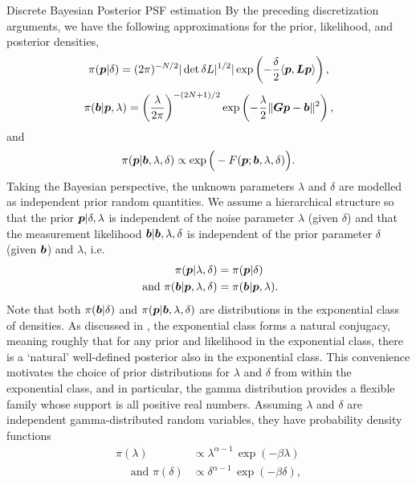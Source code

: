 \begin{chapter}{Discrete Bayesian Posterior PSF estimation}
By the preceding discretization arguments, we have the following approximations for the prior, likelihood, and posterior densities,
\begin{equation}\label{eq:discretePrior}
  \pi(\mbox{\boldmath$p$}| \delta) =(2\pi)^{-N/2} |\det \delta L|^{1/2}|\exp\left(-\frac \delta2 \langle \mbox{\boldmath$p$},\mbox{\boldmath$L$}\mbox{\boldmath$p$}\rangle\right),
\end{equation}
\begin{equation} \label{eq:discreteLiklihood}
  \pi(\mbox{\boldmath$b$} |\mbox{\boldmath$p$},\lambda) = \left(\frac{\lambda}{2\pi}  \right)^{-(2N+1)/2} \exp\left(-\frac \lambda2 \|\mbox{\boldmath$G$}\mbox{\boldmath$p$}-\mbox{\boldmath$b$}\|^2\right),
\end{equation}
and
\begin{equation}\label{eq:discretePosterior}
  \pi(\mbox{\boldmath$p$} | \mbox{\boldmath$b$},\lambda, \delta) \propto \exp\Big(-F(\mbox{\boldmath$p$};\mbox{\boldmath$b$},\lambda,\delta) \Big).
\end{equation}
Taking the Bayesian perspective, the unknown parameters $\lambda$ and $\delta$ are modelled as independent prior random quantities.
We assume a hierarchical structure so that the prior $\mbox{\boldmath$p$}|\delta,\lambda$ is independent of the noise parameter $\lambda$ (given $\delta$) and that the measurement likelihood $\mbox{\boldmath$b$}|\mbox{\boldmath$b$},\lambda,\delta$ is independent of the prior parameter $\delta$ (given $\mbox{\boldmath$b$}$) and $\lambda$, i.e.
\begin{align}
  \pi(\mbox{\boldmath$p$}|\lambda,\delta) &= \pi(\mbox{\boldmath$p$}|\delta) \\
\text{ and } \pi(\mbox{\boldmath$b$}|\mbox{\boldmath$p$},\lambda,\delta) &= \pi(\mbox{\boldmath$b$}|\mbox{\boldmath$p$},\lambda).
\end{align}
Note that both $\pi(\mbox{\boldmath$b$}|\delta)$ and $\pi(\mbox{\boldmath$p$}|\mbox{\boldmath$b$},\lambda,\delta)$ are distributions in the exponential class of densities.
As discussed in \citep{gelman2014bayesian}, the exponential class forms a natural conjugacy, meaning roughly that for any prior and likelihood in the exponential class, there is a `natural' well-defined posterior also in the exponential class.
This convenience motivates the choice of prior distributions for $\lambda$ and $\delta$ from within the exponential class, and in particular, the gamma distribution provides a flexible family whose support is all positive real numbers.
Assuming $\lambda$ and $\delta$ are independent gamma-distributed random variables, they have probability density functions 
\begin{align} 
                \pi(\lambda) &\propto \lambda^{\alpha -1}\,\exp(-\beta\lambda)\label{eq:deltaPrior}\\
\quad\text{ and }\pi(\delta) &\propto \delta^{\alpha-1}\,\exp(-\beta\delta), \label{eq:lambdaPrior}

\end{align}
\end{chapter}
